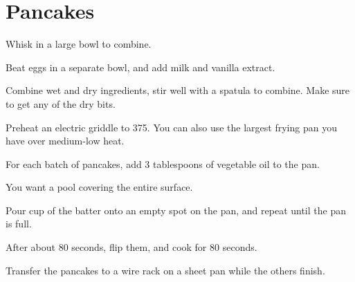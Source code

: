 \section{Pancakes}
\begin{recipe}



Whisk in a large bowl to combine.


Beat eggs in a separate bowl, and add milk and vanilla extract. 

Combine wet and dry ingredients, stir well with a spatula to combine. Make sure to 
get any of the dry bits. 


Preheat an electric griddle to 375\degree{}. You can also use the largest frying pan you have over medium-low heat.

For each batch of pancakes, add 3 tablespoons of vegetable oil to the pan.

You want a pool covering the entire surface.

Pour  cup of the batter onto an empty spot on the pan, and repeat until the pan is full.

After about 80 seconds, flip them, and cook for 80 seconds.

Transfer the pancakes to a wire rack on a sheet pan while the others finish.

\end{recipe}
